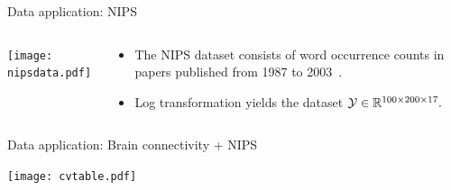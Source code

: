 \documentclass[10pt, mathserif]{beamer} %
\theoremstyle{definition}
\theoremstyle{plain}
\begin{document}
\begin{frame}{Data application: NIPS}
    \begin{columns}
\begin{column}{0.21\textwidth}
   \begin{center}
     \texttt{[image: nipsdata.pdf]}
     \end{center}
\end{column}
\begin{column}{0.7\textwidth} 
\begin{itemize}
    \item The NIPS dataset consists of word occurrence counts in papers published from 1987 to 2003~\citep{globerson2007euclidean}.
    \item Log transformation yields the dataset $\mathcal{Y}\in\mathbb{R}^{100\times200\times17}.$ 
\end{itemize}
\end{column}
\end{columns}

\end{frame}

\begin{frame}{Data application: Brain connectivity + NIPS}
      \begin{center}
     \begin{table}
    \texttt{[image: cvtable.pdf]}
    \caption{MAE comparison in the brain data and NIPS data on cross-validation (5 repetitions 5 folds).  Standard errors are reported in parenthesis.}
    \end{table}
    \end{center}
\end{frame}
\end{document}
